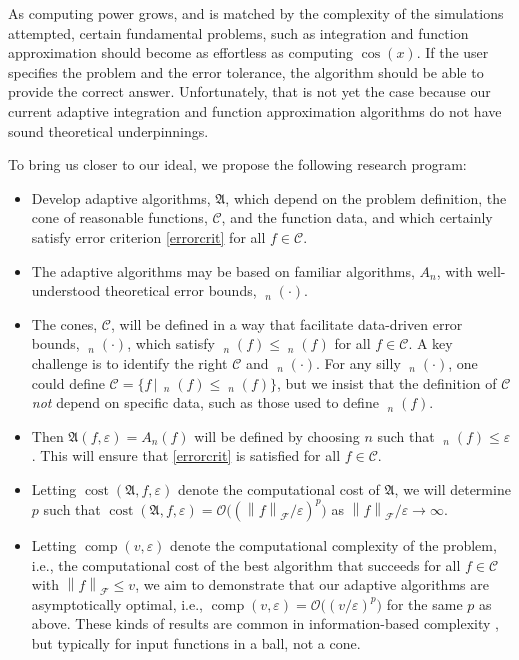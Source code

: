 \documentclass[11pt]{NSFamsart}
\DeclareMathOperator{\cost}{cost}
\DeclareMathOperator{\comp}{comp}
\DeclareMathOperator{\err}{err}
\DeclareMathOperator{\oerr}{\overline{\err}}
\DeclareMathOperator{\herr}{\widehat{\err}}
\newcommand{\cc}{\mathcal{C}}
\newcommand{\calf}{{\mathcal{F}}}
\newcommand{\fA}{\mathfrak{A}}
\newcommand{\norm}[2][{}]{\ensuremath{\left \lVert #2 \right \rVert}_{#1}}
\newcommand{\Order}{\mathcal{O}}
\begin{document}
As computing power grows, and is matched by the complexity of the simulations attempted, certain 
fundamental problems, such as integration and function approximation should become 
as effortless as computing $\cos(x)$.  If the user specifies the problem and the error tolerance, the 
algorithm should be able to provide the correct answer.  Unfortunately, 
that is not yet the case because our current adaptive integration and function approximation 
algorithms do not have sound theoretical underpinnings.

To bring us closer to our ideal, we propose the following research program:
\begin{itemize}
	\item Develop adaptive algorithms, $\fA$, which depend on the 
	problem definition, the cone of reasonable functions, $\cc$, and the
	function data, and which certainly satisfy error criterion \eqref{errorcrit} for all $f \in \cc$.  
	
	\item The adaptive algorithms may be based on familiar algorithms, $A_n$, with 
	well-understood theoretical error bounds, $\oerr_n(\cdot)$.  
	
	\item The cones, $\cc$, will be defined in a way that facilitate data-driven error 
	bounds, $\herr_n(\cdot)$, which satisfy $\oerr_n(f) \le \herr_n(f)$ for all $f\in \cc$.  A key 
	challenge is to identify the right $\cc$ and $\herr_n(\cdot)$.  For any silly 
	$\herr_n(\cdot)$, one could define $\cc = \{f \, \vert \, \oerr_n(f) 
	\le \herr_n(f) \}$, but we insist that the definition of $\cc$ \emph{not} depend on specific data, 
	such as those used to define $\herr_n(f)$.
	
	\item Then $\fA(f,\varepsilon) = A_n(f)$ will be defined by choosing $n$ such that $\herr_n(f) \le 
	\varepsilon$.  This will ensure that \eqref{errorcrit} is satisfied for all $f \in \cc$.  
	
	\item Letting $\cost(\fA,f,\varepsilon)$ denote the computational cost of $\fA$, we will
	determine $p$ such that 
	$\cost(\fA,f,\varepsilon)  = \Order\bigl((\norm[\calf]{f}/\varepsilon)^p\bigr)$ as 
	$\norm[\calf]{f}/\varepsilon 
	\to 
	\infty$.  
	
	\item Letting $\comp(v,\varepsilon)$ denote the computational complexity of the problem, i.e., 
	the computational cost of the best algorithm that succeeds for all $f \in \cc$ with $\norm[\calf]{f} 
	\le v$, we aim to demonstrate that 
	our 
	adaptive algorithms are asymptotically optimal, i.e., $\comp(v,\varepsilon) = \Order 
	\bigl((v/\varepsilon)^p \bigr)$ for the same $p$ as above.  These kinds of results are common in 
	information-based complexity \cite{TraWer98,TraWasWoz88}, but typically for input functions in 
	a ball, not a cone.
	

\end{itemize}
\end{document}
